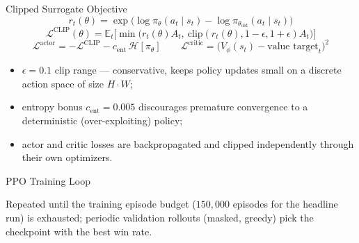 \begin{frame}{Clipped Surrogate Objective}
  \[
    r_t(\theta) = \exp\!\big(\log \pi_\theta(a_t\mid s_t) - \log \pi_{\theta_{\text{old}}}(a_t\mid s_t)\big)
  \]
  \[
    \mathcal{L}^{\text{CLIP}}(\theta) = \mathbb{E}_t\Big[\min\big(r_t(\theta)A_t,\ \text{clip}(r_t(\theta), 1{-}\epsilon, 1{+}\epsilon)A_t\big)\Big]
  \]
  \[
    \mathcal{L}^{\text{actor}} = -\mathcal{L}^{\text{CLIP}} - c_{\text{ent}}\,\mathcal{H}[\pi_\theta]
    \qquad
    \mathcal{L}^{\text{critic}} = \big(V_\phi(s_t) - \text{value target}_t\big)^2
  \]
  \begin{itemize}
    \item $\epsilon = 0.1$ clip range — conservative, keeps policy updates
      small on a discrete action space of size $H{\cdot}W$;
    \item entropy bonus $c_{\text{ent}} = 0.005$ discourages premature
      convergence to a deterministic (over-exploiting) policy;
    \item actor and critic losses are backpropagated and clipped
      \alert{independently} through their own optimizers.
  \end{itemize}
\end{frame}

\begin{frame}{PPO Training Loop}
  \centering

  \vspace{0.3cm}
  \begin{minipage}{0.85\textwidth}
    \centering
    Repeated until the training episode budget ($150{,}000$ episodes for
    the headline run) is exhausted; periodic validation rollouts (masked,
    greedy) pick the checkpoint with the best win rate.
  \end{minipage}
\end{frame}

